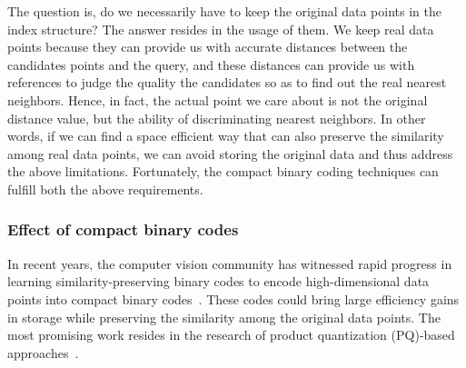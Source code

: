 \documentclass[twocolumn]{svjour3}          %
\begin{document}
The question is, do we necessarily have to keep the original data points in the index structure? The answer resides in the usage of them. We keep real data points because they can provide us with accurate distances between the candidates points and the query, and these distances can provide us with references to judge the quality the candidates so as to find out the real nearest neighbors.
Hence, in fact, the actual point we care about is not the original distance value, but the ability of discriminating nearest neighbors. In other words, if we can find a space efficient way that can also preserve the similarity among real data points, we can avoid storing the original data and thus address the above limitations. Fortunately, the compact binary coding techniques can fulfill both the above requirements.

\subsubsection{Effect of compact binary codes}\label{ssec:compact}
In recent years, the computer vision community has witnessed rapid progress in learning similarity-preserving binary codes to encode high-dimensional data points into compact binary codes~\cite{Gong2011,Torralba2008,Weiss08}. These codes could bring large efficiency gains in storage while preserving the similarity among the original data points. The most promising work resides in the research of product quantization (PQ)-based approaches~\cite{Jegou2011PQ,Babenko2012Inverted,Norouzi2013,WangWSXSL15,Yannis2014LOPQ}.

\end{document}

